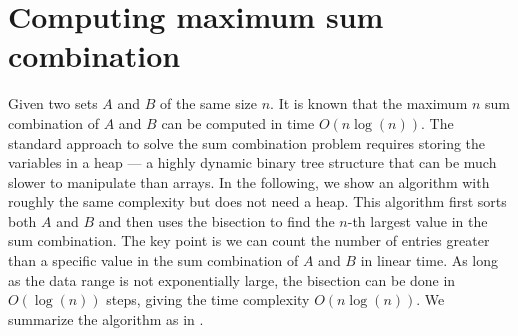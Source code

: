 \documentclass[review,supplement,onefignum,onetabnum]{siamart190516}
\begin{document}
\section{Computing maximum sum combination}\label{sec:maxsum}
Given two sets $A$ and $B$ of the same size $n$.
It is known that the maximum $n$ sum combination of $A$ and $B$ can be computed in time $O(n\log(n))$.
The standard approach to solve the sum combination problem requires storing the variables in a heap --- a highly dynamic binary tree structure that can be much slower to manipulate than arrays.
In the following, we show an algorithm with roughly the same complexity but does not need a heap.
This algorithm first sorts both $A$ and $B$ and then uses the bisection to find the $n$-th largest value in the sum combination.
The key point is we can count the number of entries greater than a specific value
in the sum combination of $A$ and $B$ in linear time.
As long as the data range is not exponentially large, the bisection can be done in $O(\log(n))$ steps, giving the time complexity $O(n\log(n))$.
We summarize the algorithm as in .
\end{document}
